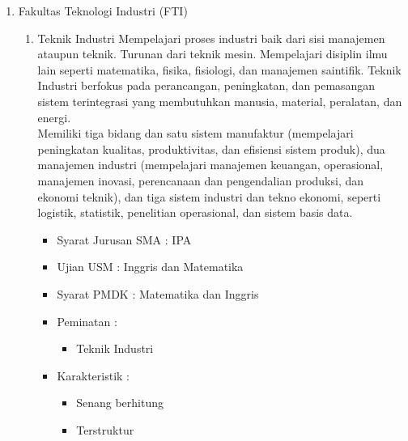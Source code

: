 \documentclass[a4paper,twoside]{article}
\begin{document}
\begin{enumerate}
\begin{enumerate}
			\item Fakultas Teknologi Industri (FTI)
			\begin{enumerate}
				\item Teknik Industri
					Mempelajari proses industri baik dari sisi manajemen ataupun teknik. Turunan dari teknik mesin. Mempelajari disiplin ilmu lain seperti matematika, fisika, fisiologi, dan manajemen saintifik. Teknik Industri berfokus pada perancangan, peningkatan, dan pemasangan sistem terintegrasi yang membutuhkan manusia, material, peralatan, dan energi.\\
Memiliki tiga bidang dan satu sistem manufaktur (mempelajari peningkatan kualitas, produktivitas, dan efisiensi sistem produk), dua manajemen industri (mempelajari manajemen keuangan, operasional, manajemen inovasi, perencanaan dan pengendalian produksi, dan ekonomi teknik), dan tiga sistem industri dan tekno ekonomi, seperti logistik, statistik, penelitian operasional, dan sistem basis data.
					\begin{itemize}
						\item Syarat Jurusan SMA : IPA
						\item Ujian USM : Inggris dan Matematika
						\item Syarat PMDK : Matematika dan Inggris
						\item Peminatan :
						\begin{itemize}
							\item Teknik Industri
						\end{itemize}
						\item Karakteristik :
						\begin{itemize}
							\item Senang berhitung
							\item Terstruktur
						\end{itemize}
					\end{itemize}
					

\end{enumerate}
\end{enumerate}
\end{enumerate}
\end{document}

